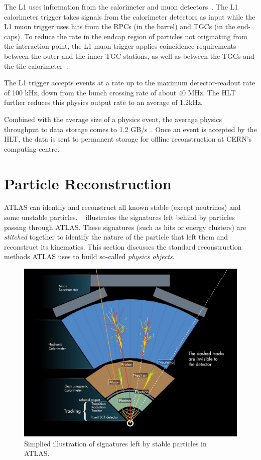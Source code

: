 The L1 uses information from the calorimeter and muon detectors~\cite{ATLAS_TDAQ}. The L1 calorimeter trigger takes signals from the calorimeter detectors as input while the L1 muon trigger uses hits from the RPCs (in the barrel) and TGCs (in the end-caps). To reduce the rate in the endcap region of particles not originating from the interaction point, the L1 muon trigger applies coincidence requirements between the outer and the inner TGC stations, as well as between the TGCs and the tile calorimeter~\cite{ATLAS_TDAQ}.

The L1 trigger accepts events at a rate up to the maximum detector-readout rate of 100 kHz, down from the bunch crossing rate of about 40 MHz. The HLT further reduces this physics output rate to an average of 1.2kHz. 

Combined with the average size of a physics event, the average physics throughput to data storage comes to 1.2 GB/s~\cite{ATLAS_TDAQ}. Once an event is accepted by the HLT, the data is sent to permanent storage for offline reconstruction at CERN’s computing centre.

\section{Particle Reconstruction} \label{sec:reco}

ATLAS can identify and reconstruct all known stable (except neutrinos) and some unstable particles. ~ illustrates the signatures left behind by particles passing through ATLAS. These signatures (such as hits or energy clusters) are \textit{stitched} together to identify the nature of the particle that left them and reconstruct its kinematics. This section discusses the standard reconstruction methods ATLAS uses to build so-called \textit{physics objects}.

\begin{figure}[!ht]
    \centering
    \includegraphics[width=0.8\linewidth]{figures//experiment/particlesATLAS.png}
    \caption{Simplied illustration of signatures left by stable particles in ATLAS.~\cite{Pequenao:1505342}}
    \label{fig:atlas-particles}
\end{figure}

